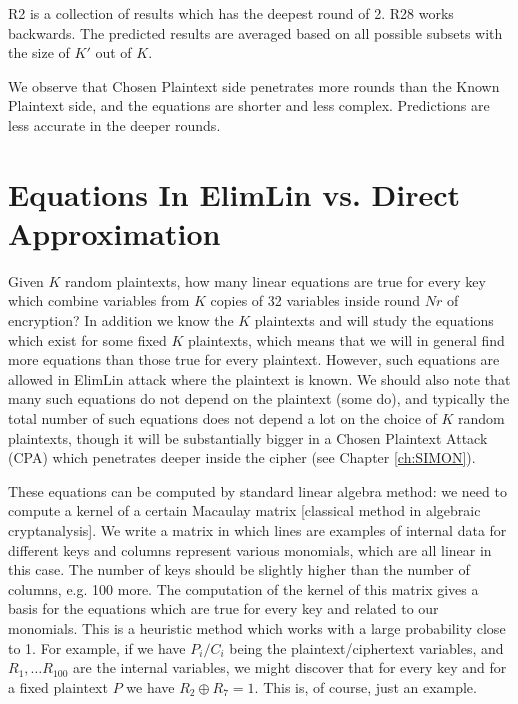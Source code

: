 R2 is a collection of results which has the deepest round of 2. R28 works backwards. 
The predicted results are averaged based on all possible subsets with the size of $K'$ out of $K$. 

We observe that Chosen Plaintext side penetrates more rounds than the Known Plaintext side, and the equations are shorter and less complex. Predictions are less accurate in the deeper rounds.
 
 
\section{Equations In ElimLin vs. Direct Approximation} \label{Sec:ElimLinVsApprox}
\vskip-5pt

Given $K$ random plaintexts,
how many linear equations are true for every key 
which combine variables from $K$ copies of 32 variables
inside round $Nr$ of encryption?
In addition we know the $K$ plaintexts and will study the equations which exist for some fixed $K$ plaintexts, which means that we will in general find more equations than those true for every plaintext. However, such equations are allowed in ElimLin attack where the plaintext is known.
We should also note that many such equations do not depend on the plaintext (some do),
and typically the total number of such equations does not depend a lot on
the choice of $K$ random plaintexts,
though it will be substantially bigger
in a Chosen Plaintext Attack (CPA) which penetrates deeper inside the cipher (see Chapter \ref{ch:SIMON}). 

These equations can be computed by standard linear algebra method:
we need to compute a kernel of a certain Macaulay matrix
[classical method in algebraic cryptanalysis].
We write a matrix
in which lines are examples of internal data for different keys
and columns represent various monomials,
which are all linear in this case.
The number of keys should be slightly higher than the number of columns,
e.g. 100 more.
The computation of the kernel of this matrix gives
a basis for the equations which are true for every key and related to our
monomials. This is a heuristic method which works with a large probability close to 1. 
For example, if we have $P_i/C_i$ being the plaintext/ciphertext variables,
and $R_1,\ldots R_{100}$ are the internal variables,
we might discover that for every key and for a fixed plaintext $P$
we have
$R_2\oplus R_7=1$. This is, of course, just an example.

